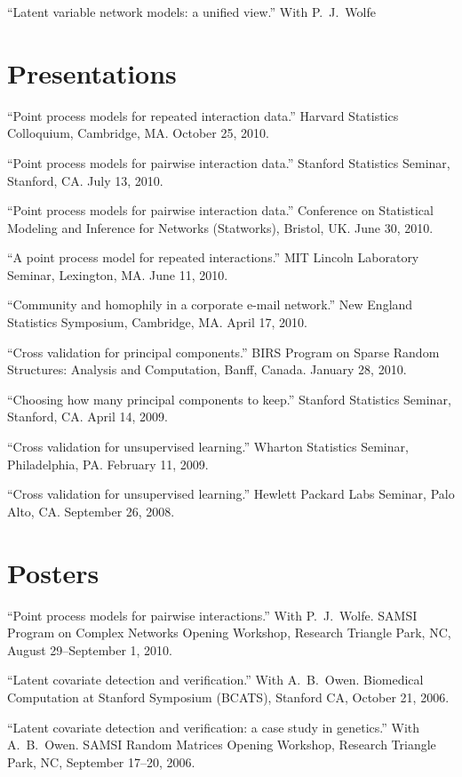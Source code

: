 \documentclass[overlapped,line,letterpaper]{res}
\begin{document}
\begin{resume}
``Latent variable network models: a unified view.''
With P.\ J.\ Wolfe


\section{\bf Presentations}

``Point process models for repeated interaction data.''
Harvard Statistics Colloquium, Cambridge, MA.  October 25, 2010.

``Point process models for pairwise interaction data.''
Stanford Statistics Seminar, Stanford, CA.  July 13, 2010.

``Point process models for pairwise interaction data.''
Conference on Statistical Modeling and Inference for Networks (Statworks),
Bristol, UK.  June 30, 2010.

``A point process model for repeated interactions.''
MIT Lincoln Laboratory Seminar, Lexington, MA. June 11, 2010.

``Community and homophily in a corporate e-mail network.''
New England Statistics Symposium, Cambridge, MA.  April 17, 2010.

``Cross validation for principal components.''
BIRS Program on Sparse Random Structures: Analysis and Computation,
Banff, Canada.
January 28, 2010.

``Choosing how many principal components to keep.''
Stanford Statistics Seminar, Stanford, CA.  April 14, 2009.

``Cross validation for unsupervised learning.''
Wharton Statistics Seminar, Philadelphia, PA.  February 11, 2009.

``Cross validation for unsupervised learning.''
Hewlett Packard Labs Seminar, Palo Alto, CA.  September 26, 2008.


\section{\bf Posters}

``Point process models for pairwise interactions.''
With P.\ J.\ Wolfe.
SAMSI Program on Complex Networks Opening Workshop,
Research Triangle Park, NC,
August 29--September 1, 2010.

``Latent covariate detection and verification.''
With A.\ B.\ Owen.
Biomedical Computation at Stanford Symposium (BCATS),
Stanford CA,
October 21, 2006.

``Latent covariate detection and verification: a case study in genetics.''
With A.\ B.\ Owen.
SAMSI Random Matrices Opening Workshop,
Research Triangle Park, NC,
September 17--20, 2006.



\end{resume}
\end{document}
